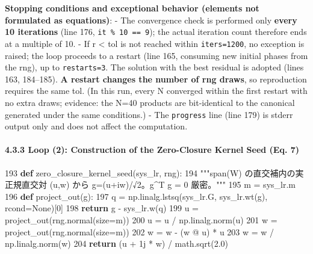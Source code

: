 \documentclass[
  a4paper,
]{ltjsarticle}
\newenvironment{Shaded}{}{}
\newcommand{\ControlFlowTok}[1]{\textcolor[rgb]{0.00,0.44,0.13}{\textbf{#1}}}
\newcommand{\DecValTok}[1]{\textcolor[rgb]{0.25,0.63,0.44}{#1}}
\newcommand{\FloatTok}[1]{\textcolor[rgb]{0.25,0.63,0.44}{#1}}
\newcommand{\KeywordTok}[1]{\textcolor[rgb]{0.00,0.44,0.13}{\textbf{#1}}}
\newcommand{\NormalTok}[1]{#1}
\newcommand{\OperatorTok}[1]{\textcolor[rgb]{0.40,0.40,0.40}{#1}}
\newcommand{\OtherTok}[1]{\textcolor[rgb]{0.00,0.44,0.13}{#1}}
\newcommand{\StringTok}[1]{\textcolor[rgb]{0.25,0.44,0.63}{#1}}
\newcommand{\VariableTok}[1]{\textcolor[rgb]{0.10,0.09,0.49}{#1}}
\begin{document}
\textbf{Stopping conditions and exceptional behavior (elements not
formulated as equations)}: - The convergence check is performed only
\textbf{every 10 iterations} (line 176, \texttt{it\ \%\ 10\ ==\ 9}); the
actual iteration count therefore ends at a multiple of 10. - If r
\textless{} tol is not reached within \texttt{iters=1200}, no exception
is raised; the loop proceeds to a restart (line 165, consuming new
initial phases from the rng), up to \texttt{restarts=3}. The solution
with the best residual is adopted (lines 163, 184--185). \textbf{A
restart changes the number of rng draws}, so reproduction requires the
same tol. (In this run, every N converged within the first restart with
no extra draws; evidence: the N=40 products are bit-identical to the
canonical generated under the same conditions.) - The \texttt{progress}
line (line 179) is stderr output only and does not affect the
computation.

\paragraph{4.3.3 Loop (2): Construction of the Zero-Closure Kernel Seed
(Eq.
7)}\label{loop-2-construction-of-the-zero-closure-kernel-seed-eq.-7}

\begin{Shaded}
\begin{Highlighting}[]
   \DecValTok{193}  \KeywordTok{def}\NormalTok{ zero\_closure\_kernel\_seed(sys\_lr, rng):}
   \DecValTok{194}      \StringTok{"""span(W) の直交補内の実正規直交対 (u,w) から g=(u+iw)/√2。g\^{}T g = 0 厳密。"""}
   \DecValTok{195}\NormalTok{      m }\OperatorTok{=}\NormalTok{ sys\_lr.m}
   \DecValTok{196}      \KeywordTok{def}\NormalTok{ project\_out(g):}
   \DecValTok{197}\NormalTok{          q }\OperatorTok{=}\NormalTok{ np.linalg.lstsq(sys\_lr.G, sys\_lr.wt(g), rcond}\OperatorTok{=}\VariableTok{None}\NormalTok{)[}\DecValTok{0}\NormalTok{]}
   \DecValTok{198}          \ControlFlowTok{return}\NormalTok{ g }\OperatorTok{{-}}\NormalTok{ sys\_lr.w(q)}
   \DecValTok{199}\NormalTok{      u }\OperatorTok{=}\NormalTok{ project\_out(rng.normal(size}\OperatorTok{=}\NormalTok{m))}
   \DecValTok{200}\NormalTok{      u }\OperatorTok{=}\NormalTok{ u }\OperatorTok{/}\NormalTok{ np.linalg.norm(u)}
   \DecValTok{201}\NormalTok{      w }\OperatorTok{=}\NormalTok{ project\_out(rng.normal(size}\OperatorTok{=}\NormalTok{m))}
   \DecValTok{202}\NormalTok{      w }\OperatorTok{=}\NormalTok{ w }\OperatorTok{{-}}\NormalTok{ (w }\OperatorTok{@}\NormalTok{ u) }\OperatorTok{*}\NormalTok{ u}
   \DecValTok{203}\NormalTok{      w }\OperatorTok{=}\NormalTok{ w }\OperatorTok{/}\NormalTok{ np.linalg.norm(w)}
   \DecValTok{204}      \ControlFlowTok{return}\NormalTok{ (u }\OperatorTok{+} \OtherTok{1j} \OperatorTok{*}\NormalTok{ w) }\OperatorTok{/}\NormalTok{ math.sqrt(}\FloatTok{2.0}\NormalTok{)}
\end{Highlighting}
\end{Shaded}
\end{document}
